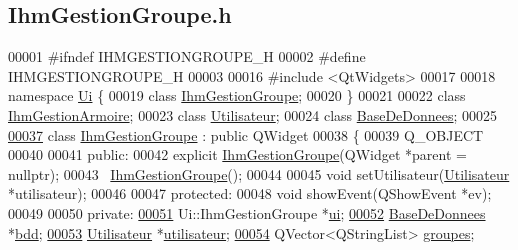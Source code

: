 \hypertarget{_ihm_gestion_groupe_8h_source}{}\subsection{Ihm\+Gestion\+Groupe.\+h}
\label{_ihm_gestion_groupe_8h_source}

\begin{DoxyCode}
00001 \textcolor{preprocessor}{#ifndef IHMGESTIONGROUPE\_H}
00002 \textcolor{preprocessor}{#define IHMGESTIONGROUPE\_H}
00003 
00016 \textcolor{preprocessor}{#include <QtWidgets>}
00017 
00018 \textcolor{keyword}{namespace }\hyperlink{namespace_ui}{Ui} \{
00019 \textcolor{keyword}{class }\hyperlink{class_ihm_gestion_groupe}{IhmGestionGroupe};
00020 \}
00021 
00022 \textcolor{keyword}{class }\hyperlink{class_ihm_gestion_armoire}{IhmGestionArmoire};
00023 \textcolor{keyword}{class }\hyperlink{class_utilisateur}{Utilisateur};
00024 \textcolor{keyword}{class }\hyperlink{class_base_de_donnees}{BaseDeDonnees};
00025 
\hyperlink{class_ihm_gestion_groupe}{00037} \textcolor{keyword}{class }\hyperlink{class_ihm_gestion_groupe}{IhmGestionGroupe} : \textcolor{keyword}{public} QWidget
00038 \{
00039     Q\_OBJECT
00040 
00041 \textcolor{keyword}{public}:
00042     \textcolor{keyword}{explicit} \hyperlink{class_ihm_gestion_groupe}{IhmGestionGroupe}(QWidget *parent = \textcolor{keyword}{nullptr});
00043     ~\hyperlink{class_ihm_gestion_groupe}{IhmGestionGroupe}();
00044 
00045     \textcolor{keywordtype}{void} setUtilisateur(\hyperlink{class_utilisateur}{Utilisateur} *utilisateur);
00046 
00047 \textcolor{keyword}{protected}:
00048       \textcolor{keywordtype}{void} showEvent(QShowEvent *ev);
00049 
00050 \textcolor{keyword}{private}:
\hyperlink{class_ihm_gestion_groupe_a9785ad3dadc1d2cad8558ca8b682dffd}{00051}     Ui::IhmGestionGroupe *\hyperlink{class_ihm_gestion_groupe_a9785ad3dadc1d2cad8558ca8b682dffd}{ui}; 
\hyperlink{class_ihm_gestion_groupe_a4f0049a7046abe7530d7f7eaed7ed2bc}{00052}     \hyperlink{class_base_de_donnees}{BaseDeDonnees} *\hyperlink{class_ihm_gestion_groupe_a4f0049a7046abe7530d7f7eaed7ed2bc}{bdd}; 
\hyperlink{class_ihm_gestion_groupe_a87b9d242561e8bf7765aa14a5e124db1}{00053}     \hyperlink{class_utilisateur}{Utilisateur} *\hyperlink{class_ihm_gestion_groupe_a87b9d242561e8bf7765aa14a5e124db1}{utilisateur};
\hyperlink{class_ihm_gestion_groupe_af2d05c88db3e19452e70727446635bc4}{00054}     QVector<QStringList> \hyperlink{class_ihm_gestion_groupe_af2d05c88db3e19452e70727446635bc4}{groupes}; 

\end{DoxyCode}
